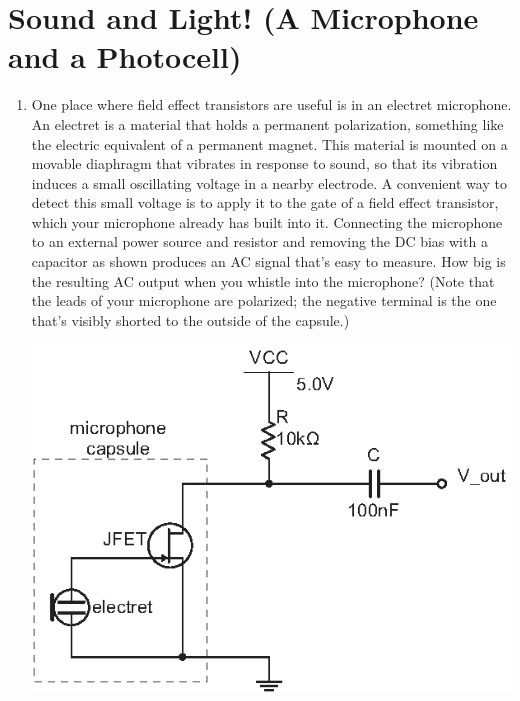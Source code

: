 \section{Sound and Light! (A Microphone and a Photocell)}
\label{lab_microphone_photocell}


\bigskip

\begin{enumerate}[wide]

\item One place where field effect transistors are useful is in an electret microphone.  An electret is a material that holds a permanent polarization, something like the electric equivalent of a permanent magnet.  This material is mounted on a movable diaphragm that vibrates in response to sound, so that its vibration induces a small oscillating voltage in a nearby electrode.  A convenient way to detect this small voltage is to apply it to the gate of a field effect transistor, which your microphone already has built into it.  Connecting the microphone to an external power source and resistor and removing the DC bias with a capacitor as shown produces an AC signal that's easy to measure.  How big is the resulting AC output when you whistle into the microphone?   (Note that the leads of your microphone are polarized; the negative terminal is the one that's visibly shorted to the outside of the capsule.)  
\begin{center}
\includegraphics{microphone_photocell/microphone_circuit.eps}
\end{center}


\end{enumerate}
